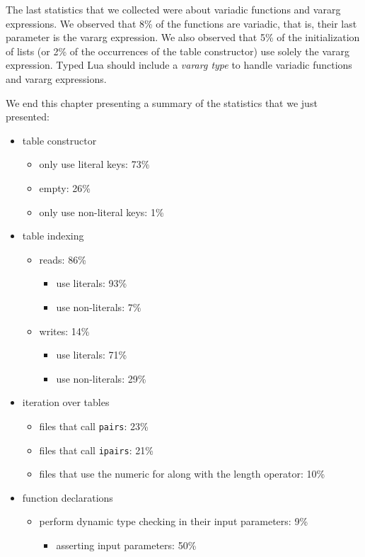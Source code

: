 The last statistics that we collected were about variadic functions
and vararg expressions.
We observed that 8\% of the functions are variadic, that is,
their last parameter is the vararg expression.
We also observed that 5\% of the initialization of lists
(or 2\% of the occurrences of the table constructor) use solely the
vararg expression.
Typed Lua should include a \emph{vararg type} to handle variadic
functions and vararg expressions.

We end this chapter presenting a summary of the statistics that
we just presented:
\begin{itemize}
\item table constructor
\begin{itemize}
\item only use literal keys: 73\%
\item empty: 26\%
\item only use non-literal keys: 1\%
\end{itemize}
\item table indexing
\begin{itemize}
\item reads: 86\%
\begin{itemize}
\item use literals: 93\%
\item use non-literals: 7\%
\end{itemize}
\item writes: 14\%
\begin{itemize}
\item use literals: 71\%
\item use non-literals: 29\%
\end{itemize}
\end{itemize}
\item iteration over tables
\begin{itemize}
\item files that call \texttt{pairs}: 23\%
\item files that call \texttt{ipairs}: 21\%
\item files that use the numeric for along with the length operator: 10\%
\end{itemize}
\item function declarations
\begin{itemize}
\item perform dynamic type checking in their input parameters: 9\%
\begin{itemize}
\item asserting input parameters: 50\%

\end{itemize}
\end{itemize}
\end{itemize}
